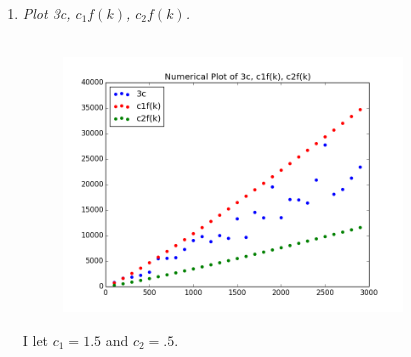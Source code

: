 \documentclass[12pt]{article}
\begin{document}
\begin{enumerate}
\begin{enumerate}
		    \item \textit{Plot 3c, $c_1f(k)$, $c_2f(k)$.}\\
		    \\
		    \begin{figure}[H]
		    \centering
			\includegraphics[width=9cm]{q3_3d.png}
			\end{figure}
		    I let $c_1 = 1.5$ and $c_2 = .5$.
		\end{enumerate}


\end{enumerate}
\end{document}
